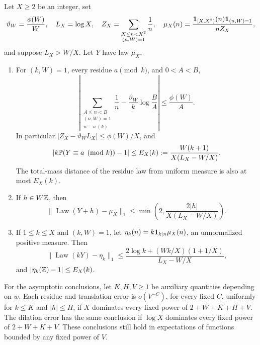 \begin{lemma}\label{lem:sampling}
Let \(X\ge2\) be an integer, set
\[
 \vartheta_W=\frac{\phi(W)}W,\quad L_X=\log X,\quad
 Z_X=\sum_{\substack{X\le n<X^2\\(n,W)=1}}\frac1n,\quad
 \mu_X(n)=\frac{\mathbf 1_{[X,X^2)}(n)\mathbf 1_{(n,W)=1}}{nZ_X},
\]
and suppose \(L_X>W/X\).  Let \(Y\) have law \(\mu_X\).
\begin{enumerate}
\item For \((k,W)=1\), every residue \(a\pmod k\), and
\(0<A<B\),
\begin{equation}\label{eq:periodic-harmonic}
 \left|\sum_{\substack{A\le n<B\\(n,W)=1\\n\equiv a\ (k)}}\frac1n
  -\frac{\vartheta_W}{k}\log\frac BA\right|
 \le\frac{\phi(W)}A.
\end{equation}
In particular \(|Z_X-\vartheta_WL_X|\le\phi(W)/X\), and
\begin{equation}\label{eq:harmonic-residue-error}
 \left|k\mathbb P(Y\equiv a\pmod k)-1\right|
 \le E_X(k):=\frac{W(k+1)}{X(L_X-W/X)}.
\end{equation}
The total-mass distance of the residue law from uniform measure is
also at most \(E_X(k)\).
\item If \(h\in W\mathbb Z\), then
\begin{equation}\label{eq:harmonic-translation}
 \|\operatorname{Law}(Y+h)-\mu_X\|_1
 \le \min\left(2,\frac{2|h|}{X(L_X-W/X)}\right).
\end{equation}
\item If \(1\le k\le X\) and \((k,W)=1\), let
\(\eta_k(n)=k\mathbf 1_{k\mid n}\mu_X(n)\), an unnormalized positive
measure.  Then
\begin{equation}\label{eq:harmonic-dilation}
 \|\operatorname{Law}(kY)-\eta_k\|_1
 \le\frac{2\log k+(Wk/X)(1+1/X)}{L_X-W/X},
\end{equation}
and \(|\eta_k(\mathbb Z)-1|\le E_X(k)\).
\end{enumerate}
For the asymptotic conclusions, let \(K,H,V\ge1\) be auxiliary
quantities depending on \(w\).  Each residue and translation error is
\(o(V^{-C})\), for every fixed \(C\), uniformly for
\(k\le K\) and \(|h|\le H\), if \(X\) dominates every fixed
power of \(2+W+K+H+V\).  The dilation error has the same conclusion
if \(\log X\) dominates every fixed power of \(2+W+K+V\).
These conclusions still hold in expectations of functions bounded
by any fixed power of \(V\).
\end{lemma}

